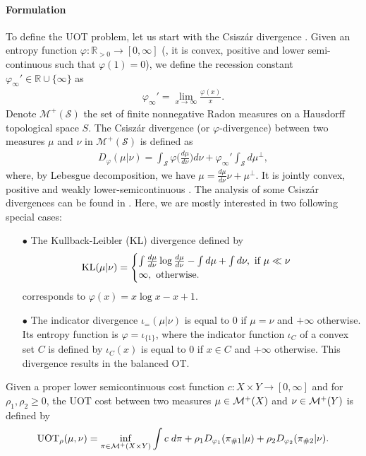 \paragraph{Formulation} To define the UOT problem, let us start with
the Csiszár divergence \citep{Csiszar63}. Given an entropy function
$\varphi : \mathbb R_{> 0} \to [0, \infty]$ (\ie, it is convex,
positive and lower semi-continuous such that $\varphi(1) = 0$), we define
the recession constant $\varphi_{\infty}' \in \mathbb R \cup \{ \infty \}$ as
\begin{align}
  \varphi_{\infty}' = \lim_{x \to \infty} \frac{\varphi(x)}{x}.
\end{align}
Denote $\mathcal M^+(\mathcal S)$ the set of finite nonnegative Radon measures on a
Hausdorff topological space $S$. The Csiszár divergence (or $\varphi$-divergence) between
two measures $\mu$ and $\nu$ in $\mathcal M^+(\mathcal S)$ is defined as
\begin{align}
  D_{\varphi}(\mu \vert \nu) = \int_\mathcal S \varphi \Big( \frac{d\mu}{d\nu} \Big) d\nu +
  \varphi_{\infty}' \int_\mathcal S d\mu^{\perp},
\end{align}
where, by Lebesgue decomposition, we have $\mu = \frac{d\mu}{d\nu} \nu + \mu^{\perp}$.
It is jointly convex, positive and weakly lower-semicontinuous \citep{Liero18}.
The analysis of some Csiszár divergences can be found in \citep{Sejourne19}.
Here, we are mostly interested in two following special cases:
\begin{itemize}
  \item[$\bullet$] The Kullback-Leibler (KL) divergence defined by
  \begin{align}
    \text{KL}(\mu \vert \nu) =
    \begin{cases}
      \int \frac{d \mu}{ d \nu} \log \frac{d \mu}{ d \nu} - \int d\mu + \int d\nu,
      \text{ if } \mu \ll \nu \\
      \infty, \text{ otherwise}.
    \end{cases}
  \end{align}
  corresponds to $\varphi(x) = x \log x - x + 1$.

  \item[$\bullet$] The indicator divergence $\iota_{=}(\mu \vert \nu)$ is equal to $0$
  if $\mu = \nu$ and $+\infty$ otherwise.
  Its entropy function is $\varphi = \iota_{\{ 1 \}}$, where the indicator function $\iota_C$
  of a convex set $C$ is defined by $\iota_C(x)$ is equal to $0$ if $x\in C$ and $+\infty$ otherwise.
  This divergence results in the balanced OT.
\end{itemize}
Given a proper lower semicontinuous cost function $c: X \times Y \to [0, \infty]$
and for $\rho_1, \rho_2 \geq 0$, the UOT cost between two measures $\mu \in \mathcal M^+(X)$ and
$\nu \in \mathcal M^+(Y)$ is defined by
\begin{align}
  \text{UOT}_{\rho}(\mu, \nu) = \inf_{\pi \in \mathcal M^+(X \times Y)} \int c \; d\pi
  + \rho_1 D_{\varphi_1}(\pi_{\# 1} | \mu)
  + \rho_2 D_{\varphi_2}(\pi_{\# 2} | \nu).
\end{align}

